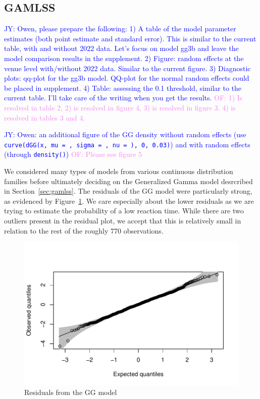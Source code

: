 \documentclass[12pt, letterpaper]{article}
\newcommand{\jy}[1]{\textcolor{blue}{JY: #1}}
\newcommand{\of}[1]{\textcolor{violet}{OF: #1}}
\begin{document}
\subsection{GAMLSS} \label{subsec:Results_GLMM}

\jy{Owen, please prepare the following:
1) A table of the model parameter estimates (both point estimate and
standard error). This is similar to the current table, with and
without 2022 data. Let's focus on model gg3b and leave the model
comparison results in the supplement.
2) Figure: random effects at the venue level with/without 2022
data. Similar to the current figure.
3) Diagnostic plots: qq-plot for the gg3b model. QQ-plot for the
normal random effects could be placed in supplement.
4) Table: assessing the 0.1 threshold, similar to the current table.
I'll take care of the writing when you get the results.}
\of{1) Is resolved in table 2, 2) is resolved in figure 4, 3) is resolved in
figure 3. 4) is resolved in tables 3 and 4.}

\jy{Owen: an additional figure of the GG density without random
  effects (use \texttt{curve(dGG(x, mu = , sigma = , nu =  ), 0, 0.03)}) and
  with random effects (through \texttt{density()})}
\of{Please see figure 5}

We considered many types of models from various continuous distribution families
before ultimately deciding on the Generalized Gamma model desrcribed in
Section~\ref{sec:gamlss}.  The residuals of the GG model were particularly
strong, as evidenced by Figure~\ref{fig:Residuals}.  We care especially about
the lower residuals as we are trying to estimate the probability of a low reaction
time.  While there are two outliers present in the residual plot, we accept that
this is relatively small in relation to the rest of the roughly 770 observations.


\begin{figure}[tbp]
  \centering
  \includegraphics{GGResiduals}
  \caption{Residuals from the GG model}
  \label{fig:Residuals}
\end{figure}
\end{document}

